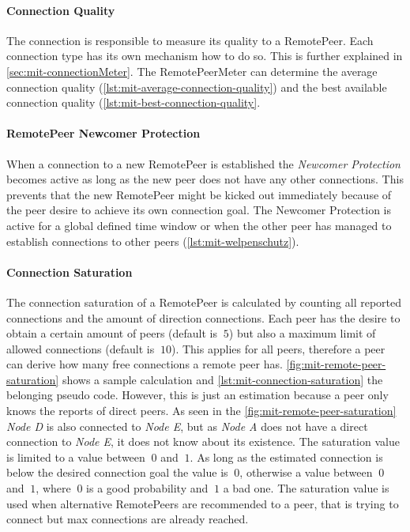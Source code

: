 \paragraph{Connection Quality}
The connection is responsible to measure its quality to a RemotePeer. Each connection type has its own mechanism how to do so. This is further explained in \vref{sec:mit-connectionMeter}.
The RemotePeerMeter can determine the average connection quality (\vref{lst:mit-average-connection-quality}) and the best available connection quality (\vref{lst:mit-best-connection-quality}.

\paragraph{RemotePeer Newcomer Protection}
When a connection to a new RemotePeer is established the \textit{Newcomer Protection} becomes active as long as the new peer does not have any other connections. This prevents that the new RemotePeer might be kicked out immediately because of the peer desire to achieve its own connection goal. The Newcomer Protection is active for a global defined time window or when the other peer has managed to establish connections to other peers (\vref{lst:mit-welpenschutz}).

\paragraph{Connection Saturation}
The connection saturation of a RemotePeer is calculated by counting all reported connections and the amount of direction connections. Each peer has the desire to obtain a certain amount of peers (default is $\ 5 $) but also a maximum limit of allowed connections (default is $\ 10 $). This applies for all peers, therefore a peer can derive how many free connections a remote peer has. \vref{fig:mit-remote-peer-saturation} shows a sample calculation and \vref{lst:mit-connection-saturation} the belonging pseudo code. 
However, this is just an estimation because a peer only knows the reports of direct peers. As seen in the \vref{fig:mit-remote-peer-saturation} \textit{Node D} is also connected to \textit{Node E}, but as \textit{Node A} does not have a direct connection to \textit{Node E}, it does not know about its existence.
The saturation value is limited to a value between $\ 0 $ and $\ 1 $. As long as the estimated connection is below the desired connection goal the value is $\ 0 $, otherwise a value between $\ 0 $ and $\ 1 $, where $\ 0 $ is a good probability and $\ 1 $ a bad one.
The saturation value is used when alternative RemotePeers are recommended to a peer, that is trying to connect but max connections are already reached.

